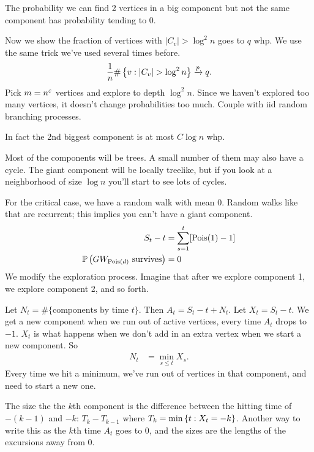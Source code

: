 The probability we can find 2 vertices in a big component but not the same component has probability tending to 0.

Now we show the fraction of vertices with $|C_v|>\log^2 n$  goes to $q$ whp.
We use the same trick we've used several times before. 
\begin{align}
\rc n \#\set{v}{|C_v|>\log^2 n} \xra p q.
\end{align}
Pick $m=n^\varepsilon$ vertices and explore to depth $\log^2n$. Since we haven't explored too many vertices, it doesn't change probabilities too much. Couple with iid random branching processes.

In fact the 2nd biggest component is at most $C\log n$ whp.

Most of the components will be trees. A small number of them may also have a cycle. The giant component will be locally treelike, but if you look at a neighborhood of size $\log n$ you'll start to see lots of cycles. %

For the critical case, we have a random walk with mean 0. Random walks like that are recurrent; this implies you can't have a giant component.
\begin{align}
S_t-t &= \sum_{s=1}^{t} [\text{Pois}(1)-1]\\
\mathbb{P}\left( \text{$GW_{\text{Pois}(d)}$ survives} \right)&=0
\end{align}
We modify the exploration process. Imagine that after we explore component 1, we explore component 2, and so forth. 

Let $N_t=\#\{\text{components by time $t$}\}$. Then $A_t=S_t-t+N_t$. Let $X_t=S_t-t$.
We get a new component when we run out of active vertices, every time $A_t$ drops to $-1$. $X_t$ is what happens when we don't add in an extra vertex when we start a new component. So
\begin{align}
N_t &= \min_{s\le t} X_s.
\end{align}
Every time we hit a minimum, we've run out of vertices in that component, and need to start a new one.

The size the the $k$th component is the difference between the hitting time of $-(k-1)$ and $-k$: $T_k-T_{k-1}$  where $T_k=\min\left\{{t}:{X_t=-k}\right\}$.
Another way to write this as the $k$th time $A_t$ goes to 0, and the sizes are the lengths of the excursions away from 0.

